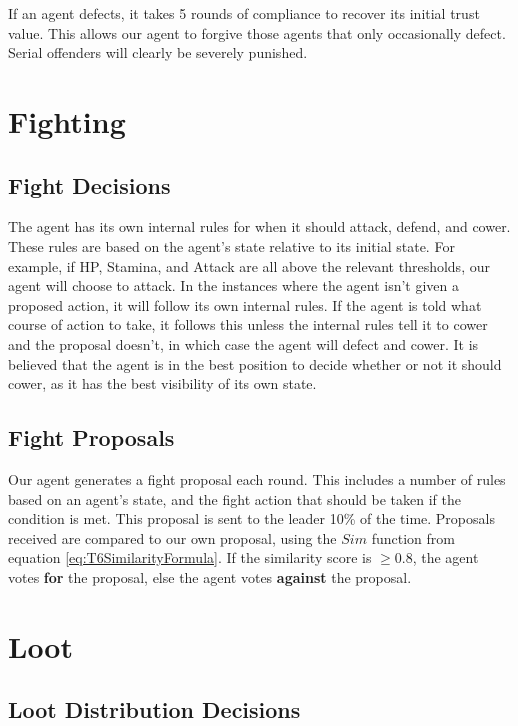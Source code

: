 If an agent defects, it takes 5 rounds of compliance to recover its initial trust value. This allows our agent to forgive those agents that only occasionally defect. Serial offenders will clearly be severely punished.

\section{Fighting}

\subsection{Fight Decisions}

The agent has its own internal rules for when it should attack, defend, and cower. These rules are based on the agent's state relative to its initial state. For example, if HP, Stamina, and Attack are all above the relevant thresholds, our agent will choose to attack. In the instances where the agent isn't given a proposed action, it will follow its own internal rules. If the agent is told what course of action to take, it follows this unless the internal rules tell it to cower and the proposal doesn't, in which case the agent will defect and cower. It is believed that the agent is in the best position to decide whether or not it should cower, as it has the best visibility of its own state.

\subsection{Fight Proposals}\label{T6FightProposals}

Our agent generates a fight proposal each round. This includes a number of rules based on an agent's state, and the fight action that should be taken if the condition is met. This proposal is sent to the leader 10\% of the time. Proposals received are compared to our own proposal, using the $Sim$ function from equation \ref{eq:T6SimilarityFormula}. If the similarity score is $\geq 0.8$, the agent votes \textbf{for} the proposal, else the agent votes \textbf{against} the proposal.

\section{Loot}

\subsection{Loot Distribution Decisions}

